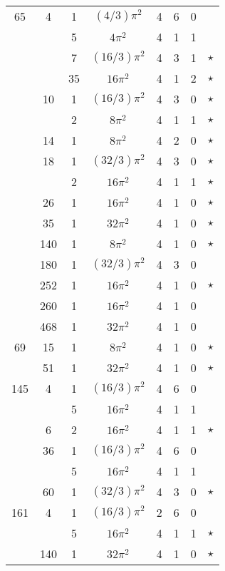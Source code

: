 \documentclass[12pt]{amsart}
\begin{document}
\begin{tabular}{ccc|ccccc}
65 & 4 & 1 & $(4/3)\pi^2$ & 4 & 6 & 0 &  \\
 &  & 5 & $4\pi^2$ & 4 & 1 & 1 &  \\
 &  & 7 & $(16/3)\pi^2$ & 4 & 3 & 1 & $\star$ \\
 &  & 35 & $16\pi^2$ & 4 & 1 & 2 & $\star$ \\
 & 10 & 1 & $(16/3)\pi^2$ & 4 & 3 & 0 & $\star$ \\
 &  & 2 & $8\pi^2$ & 4 & 1 & 1 & $\star$ \\
 & 14 & 1 & $8\pi^2$ & 4 & 2 & 0 & $\star$ \\
 & 18 & 1 & $(32/3)\pi^2$ & 4 & 3 & 0 & $\star$ \\
 &  & 2 & $16\pi^2$ & 4 & 1 & 1 & $\star$ \\
 & 26 & 1 & $16\pi^2$ & 4 & 1 & 0 & $\star$ \\
 & 35 & 1 & $32\pi^2$ & 4 & 1 & 0 & $\star$ \\
 & 140 & 1 & $8\pi^2$ & 4 & 1 & 0 & $\star$ \\
 & 180 & 1 & $(32/3)\pi^2$ & 4 & 3 & 0 &  \\
 & 252 & 1 & $16\pi^2$ & 4 & 1 & 0 & $\star$ \\
 & 260 & 1 & $16\pi^2$ & 4 & 1 & 0 &  \\
 & 468 & 1 & $32\pi^2$ & 4 & 1 & 0 &  \\
69 & 15 & 1 & $8\pi^2$ & 4 & 1 & 0 & $\star$ \\
 & 51 & 1 & $32\pi^2$ & 4 & 1 & 0 & $\star$ \\
145 & 4 & 1 & $(16/3)\pi^2$ & 4 & 6 & 0 &  \\
 &  & 5 & $16\pi^2$ & 4 & 1 & 1 &  \\
 & 6 & 2 & $16\pi^2$ & 4 & 1 & 1 & $\star$ \\
 & 36 & 1 & $(16/3)\pi^2$ & 4 & 6 & 0 &  \\
 &  & 5 & $16\pi^2$ & 4 & 1 & 1 &  \\
 & 60 & 1 & $(32/3)\pi^2$ & 4 & 3 & 0 & $\star$ \\
161 & 4 & 1 & $(16/3)\pi^2$ & 2 & 6 & 0 &  \\
 &  & 5 & $16\pi^2$ & 4 & 1 & 1 & $\star$ \\
 & 140 & 1 & $32\pi^2$ & 4 & 1 & 0 & $\star$ \\
\end{tabular}
\end{document}
